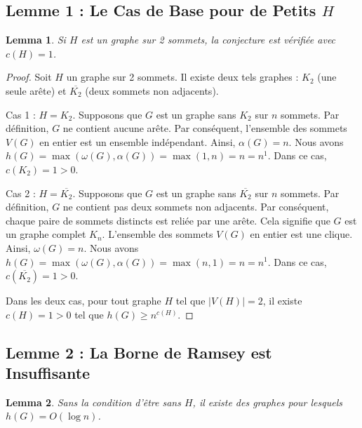 \documentclass[12pt, a4paper]{article}
\newtheorem{lemma}{Lemma}
\begin{document}
\subsection{Lemme 1 : Le Cas de Base pour de Petits $H$}

\begin{lemma}
Si $H$ est un graphe sur 2 sommets, la conjecture est vérifiée avec $c(H) = 1$.
\end{lemma}

\begin{proof}
Soit $H$ un graphe sur 2 sommets. Il existe deux tels graphes : $K_2$ (une seule arête) et $\overline{K_2}$ (deux sommets non adjacents).

Cas 1 : $H = K_2$.
Supposons que $G$ est un graphe sans $K_2$ sur $n$ sommets. Par définition, $G$ ne contient aucune arête. Par conséquent, l'ensemble des sommets $V(G)$ en entier est un ensemble indépendant. Ainsi, $\alpha(G) = n$.
Nous avons $h(G) = \max(\omega(G), \alpha(G)) = \max(1, n) = n = n^1$.
Dans ce cas, $c(K_2) = 1 > 0$.

Cas 2 : $H = \overline{K_2}$.
Supposons que $G$ est un graphe sans $\overline{K_2}$ sur $n$ sommets. Par définition, $G$ ne contient pas deux sommets non adjacents. Par conséquent, chaque paire de sommets distincts est reliée par une arête. Cela signifie que $G$ est un graphe complet $K_n$.
L'ensemble des sommets $V(G)$ en entier est une clique. Ainsi, $\omega(G) = n$.
Nous avons $h(G) = \max(\omega(G), \alpha(G)) = \max(n, 1) = n = n^1$.
Dans ce cas, $c(\overline{K_2}) = 1 > 0$.

Dans les deux cas, pour tout graphe $H$ tel que $|V(H)| = 2$, il existe $c(H) = 1 > 0$ tel que $h(G) \geq n^{c(H)}$.
\end{proof}

\subsection{Lemme 2 : La Borne de Ramsey est Insuffisante}

\begin{lemma}
Sans la condition d'être sans $H$, il existe des graphes pour lesquels $h(G) = O(\log n)$.
\end{lemma}
\end{document}
